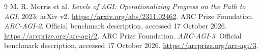 \begin{thebibliography}{9}
 M. R. Morris et al. \emph{Levels of AGI:
Operationalizing Progress on the Path to AGI}. 2023; arXiv v2.
\url{https://arxiv.org/abs/2311.02462}.
 ARC Prize Foundation. \emph{ARC-AGI-2}. Official
benchmark description, accessed 17 October 2026.
\url{https://arcprize.org/arc-agi/2}.
 ARC Prize Foundation. \emph{ARC-AGI-3}. Official
benchmark description, accessed 17 October 2026.
\url{https://arcprize.org/arc-agi/3}.
\end{thebibliography}
